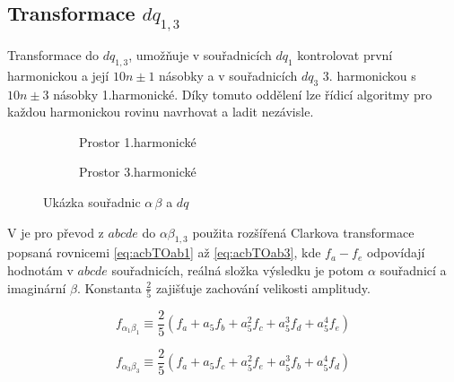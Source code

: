\subsection{Transformace \texorpdfstring{$dq_{1,3}$}{dq 1,3}}
\label{kap:transformace}
 

Transformace do $dq_{1,3}$, umožňuje v souřadnicích $dq_ 1$ kontrolovat první harmonickou a její $10n\pm1$ násobky a v souřadnicích $dq_3$  3. harmonickou s $10n\pm3$ násobky 1.harmonické. \cite{analyseOfMultiphase} Díky tomuto oddělení lze řídicí algoritmy pro každou harmonickou rovinu navrhovat a ladit nezávisle.




\begin{figure}[h]
     \centering
     \begin{subfigure}[b]{0.45\textwidth}
         \centering
         
         \caption{Prostor 1.harmonické }
         \label{fig:vlevo}
     \end{subfigure}
     \hfill %
     \begin{subfigure}[b]{0.45\textwidth}
         \centering
         
         \caption{Prostor 3.harmonické}
         \label{fig:vpravo}
     \end{subfigure}

     \caption{Ukázka souřadnic $\alpha \, \beta$ a $dq$}
     \label{fig:ukazka alfa beta 13}
\end{figure}




V \cite{analyseOfMultiphase} je pro převod z $abcde$ do $\alpha \beta_{1,3}$ použita rozšířená Clarkova transformace popsaná rovnicemi  \ref{eq:acbTOab1} až \ref{eq:acbTOab3}, kde $f_a-f_e$ odpovídají hodnotám v $abcde$ souřadnicích, reálná složka výsledku je potom $\alpha$ souřadnicí a imaginární $\beta$. Konstanta $\frac{2}{5}$ zajišťuje zachování velikosti amplitudy.

\begin{equation}
\label{eq:acbTOab1}
f_{\alpha_1 \beta_1 } \equiv \frac{2}{5} \left( f_{a} + a_5 f_{b} + a_5^2 f_{c} + a_5^3 f_{d} + a_5^4 f_{e} \right)
\end{equation}

\begin{equation}
    \label{eq:abc to 0}
    f_{\alpha_3 \beta_3 } \equiv \frac{2}{5} \left( f_{a} + a_5 f_{c} + a_5^2 f_{e} + a_5^3 f_{b} + a_5^4 f_{d} \right)
\end{equation}


